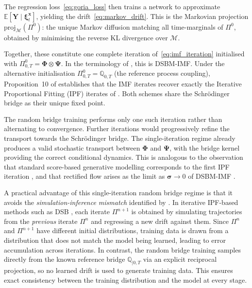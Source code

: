 \documentclass{article}
\newcommand{\Schrodinger}{Schr\"odinger\xspace}
\def\E{\mathbb{E}}
\def\xib{\boldsymbol{\xi}}
\theoremstyle{definition}
\begin{document}
The regression loss~\eqref{eq:goria_loss} then trains a network to approximate $\E[\boldsymbol{Y} \mid \xib_t^{\boldsymbol{x}}]$, yielding the drift~\eqref{eq:markov_drift}. This is the Markovian projection $\mathrm{proj}_{\mathcal{M}}(\Pi^0)$: the unique Markov diffusion matching all time-marginals of $\Pi^0$, obtained by minimising the reverse KL divergence over $\mathcal{M}$.

Together, these constitute one complete iteration of~\eqref{eq:imf_iteration} initialised with $\Pi^0_{0,T} = \boldsymbol{\Phi} \otimes \boldsymbol{\Psi}$. In the terminology of \cite{shi2023diffusion}, this is DSBM-IMF. Under the alternative initialisation $\Pi^0_{0,T} = \mathbb{Q}_{0,T}$ (the reference process coupling), Proposition~10 of \cite{shi2023diffusion} establishes that the IMF iterates recover exactly the Iterative Proportional Fitting (IPF) iterates of \cite{debortoli2021diffusion}. Both schemes share the \Schrodinger bridge as their unique fixed point.

The random bridge training performs only one such iteration rather than alternating to convergence. Further iterations would progressively refine the transport towards the \Schrodinger bridge. The single-iteration regime already produces a valid stochastic transport between $\boldsymbol{\Phi}$ and $\boldsymbol{\Psi}$, with the bridge kernel providing the correct conditional dynamics. This is analogous to the observation that standard score-based generative modelling corresponds to the first IPF iteration \cite{debortoli2021diffusion}, and that rectified flow arises as the limit as $\boldsymbol{\sigma} \to 0$ of DSBM-IMF \cite{shi2023diffusion}.

A practical advantage of this single-iteration random bridge regime is that it avoids the \emph{simulation-inference mismatch} identified by \cite{peluchetti2023diffusion}. In iterative IPF-based methods such as DSB \cite{debortoli2021diffusion}, each iterate $\Pi^{n+1}$ is obtained by simulating trajectories from the \emph{previous} iterate $\Pi^n$ and regressing a new drift against them. Since $\Pi^n$ and $\Pi^{n+1}$ have different initial distributions, training data is drawn from a distribution that does not match the model being learned, leading to error accumulation across iterations. In contrast, the random bridge training samples directly from the known reference bridge $\mathbb{Q}_{|0,T}$ via an explicit reciprocal projection, so no learned drift is used to generate training data. This ensures exact consistency between the training distribution and the model at every stage.
\end{document}
